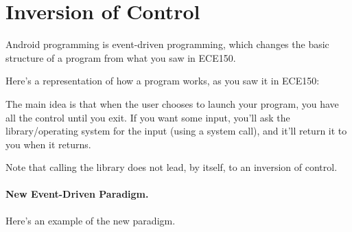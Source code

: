 
\section*{Inversion of Control}
Android programming is event-driven programming,
which changes the basic structure of a program from what you saw in ECE150.

Here's a representation of how a program works, as you saw it in ECE150:

\begin{center}
\end{center}

The main idea is that when the user chooses to launch your program,
you have all the control until you exit. If you want some input, you'll ask
the library/operating system for the input (using a system call), and
it'll return it to you when it returns. 

Note that calling the library does not lead, by itself, to an inversion of control.

\paragraph{New Event-Driven Paradigm.} Here's an example of the new paradigm.

